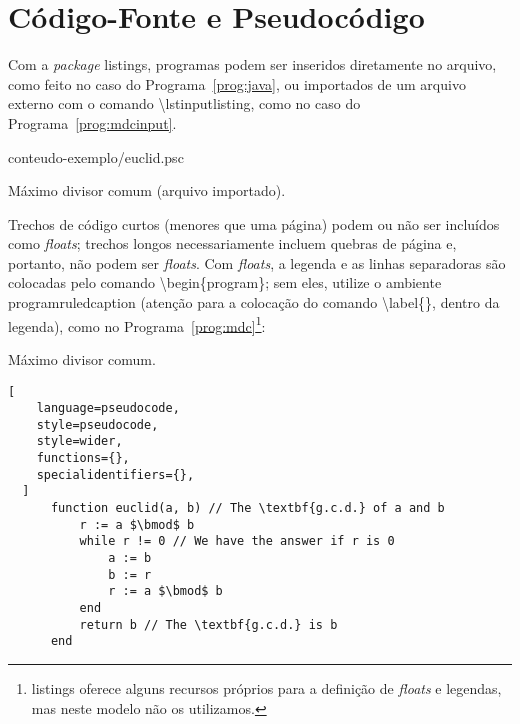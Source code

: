 
\chapter{Código-Fonte e Pseudocódigo}
\label{ap:pseudocode}

Com a \textit{package} \textsf{listings}, programas podem ser inseridos
diretamente no arquivo, como feito no caso do Programa~\ref{prog:java},
ou importados de um arquivo externo com o comando
\textsf{\textbackslash{}lstinputlisting}, como no caso
do Programa~\ref{prog:mdcinput}.

\begin{program}
  
  {conteudo-exemplo/euclid.psc}

  \caption{Máximo divisor comum (arquivo importado).\label{prog:mdcinput}}
\end{program}

Trechos de código curtos (menores que uma página) podem ou não ser
incluídos como \textit{floats}; trechos longos necessariamente incluem
quebras de página e, portanto, não podem ser \textit{floats}. Com
\textit{floats}, a legenda e as linhas separadoras são colocadas pelo
comando \textsf{\textbackslash{}begin\{program\}}; sem eles, utilize o
ambiente \textsf{programruledcaption} (atenção para a colocação do
comando \textsf{\textbackslash{}label\{\}}, dentro da legenda), como
no Programa~\ref{prog:mdc}\footnote{\textsf{listings} oferece alguns
recursos próprios para a definição de \textit{floats} e legendas, mas
neste modelo não os utilizamos.}:

\begin{programruledcaption}{Máximo divisor comum.\label{prog:mdc}}
  \begin{lstlisting}[
    language=pseudocode,
    style=pseudocode,
    style=wider,
    functions={},
    specialidentifiers={},
  ]
      function euclid(a, b) // The \textbf{g.c.d.} of a and b
          r := a $\bmod$ b
          while r != 0 // We have the answer if r is 0
              a := b
              b := r
              r := a $\bmod$ b
          end
          return b // The \textbf{g.c.d.} is b
      end
  \end{lstlisting}
\end{programruledcaption}


